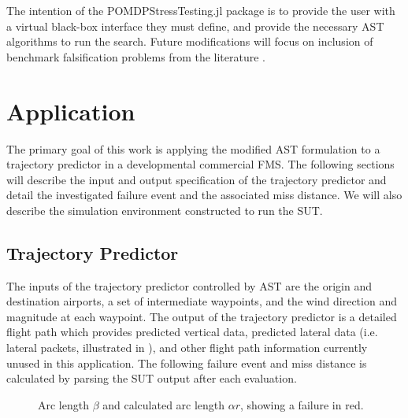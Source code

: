 The intention of the POMDPStressTesting.jl package is to provide the user with a virtual black-box interface they must define, and provide the necessary AST algorithms to run the search. Future modifications will focus on inclusion of benchmark falsification problems from the literature  \cite{arch_comp}.



\section{Application}
\label{sec:application}

The primary goal of this work is applying the modified AST formulation to a trajectory predictor in a developmental commercial FMS.
The following sections will describe the input and output specification of the trajectory predictor and detail the investigated failure event and the associated miss distance.
We will also describe the simulation environment constructed to run the SUT.




\subsection{Trajectory Predictor}
The inputs of the trajectory predictor controlled by AST are the origin and destination airports, a set of intermediate waypoints, and the wind direction and magnitude at each waypoint.
The output of the trajectory predictor is a detailed flight path which provides predicted vertical data, predicted lateral data (i.e. lateral packets, illustrated in ), and other flight path information currently unused in this application.
The following failure event and miss distance is calculated by parsing the SUT output after each evaluation.




\begin{figure}[!hb]
\centering
\resizebox{0.6\columnwidth}{!}{}
\caption{Arc length $\beta$ and calculated arc length $\alpha r$, showing a failure in red.}
\label{fig:arc_length}
\end{figure}

